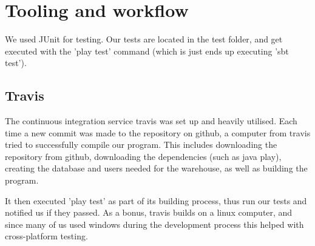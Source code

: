 \section{Tooling and workflow}

We used JUnit for testing. Our tests are located in the test folder, and get executed with
the 'play test' command  (which is just ends up executing 'sbt test').

\subsection{Travis}
The continuous integration service travis was set up and heavily utilised. 
Each time a new commit was made to the repository on github, a computer from travis 
tried to successfully compile our program. This includes downloading the repository from github,
downloading the dependencies (such as java play),
creating the database and users needed for the warehouse, as well as building the program.

It then executed 'play test' as part of its building process, thus run our tests and notified us if they passed. As a bonus, travis builds on a linux computer, and since many of us used windows during the development process this helped with cross-platform testing.
